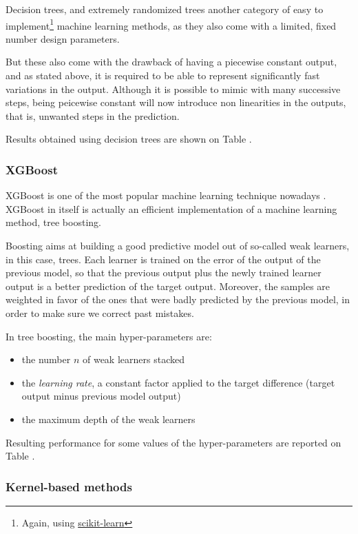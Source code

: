 Decision trees, and extremely randomized trees \cite{extremely-randomized-trees} another category of easy to implement\footnote{Again, using \href{https://scikit-learn.org/stable/modules/ensemble.html\#forests-of-randomized-trees}{scikit-learn}} machine learning methods, as they also come with a limited, fixed number design parameters.

But these also come with the drawback of having a piecewise constant output, and as stated above, it is required to be able to represent significantly fast variations in the output. Although it is possible to mimic with many successive steps, being peicewise constant will now introduce non linearities in the outputs, that is, unwanted steps in the prediction.

Results obtained using decision trees are shown on Table .

\subsubsection{XGBoost}

XGBoost is one of the most popular machine learning technique nowadays \cite{XGBoost}. XGBoost in itself is actually an efficient implementation of a machine learning method, tree boosting.

Boosting aims at building a good predictive model out of so-called weak learners, in this case, trees. Each learner is trained on the error of the output of the previous model, so that the previous output plus the newly trained learner output is a better prediction of the target output. Moreover, the samples are weighted in favor of the ones that were badly predicted by the previous model, in order to make sure we correct past mistakes.

In tree boosting, the main hyper-parameters are:
\begin{itemize}
    \item the number $n$ of weak learners stacked
    \item the \textit{learning rate}, a constant factor applied to the target difference (target output minus previous model output)
    \item the maximum depth of the weak learners
\end{itemize}

Resulting performance for some values of the hyper-parameters are reported on Table .

\subsubsection{Kernel-based methods\label{section:kernel-methods}}

